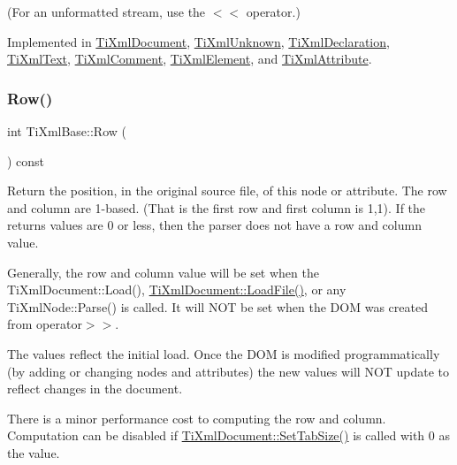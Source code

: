 (For an unformatted stream, use the $<$$<$ operator.) 

Implemented in \hyperlink{class_ti_xml_document_aa9e166fae51da603641380a964f21eeb}{Ti\+Xml\+Document}, \hyperlink{class_ti_xml_unknown_a5793fbc48ab3419783c0e866ca2d334e}{Ti\+Xml\+Unknown}, \hyperlink{class_ti_xml_declaration_ae46cff6565f299210ab945e78bf28514}{Ti\+Xml\+Declaration}, \hyperlink{class_ti_xml_text_a75f6895906333894e2574cc8cf77ea79}{Ti\+Xml\+Text}, \hyperlink{class_ti_xml_comment_a873171beac19d40f0eaae945711c98ed}{Ti\+Xml\+Comment}, \hyperlink{class_ti_xml_element_aa31a15cddfb8601a31236fe7d2569fb4}{Ti\+Xml\+Element}, and \hyperlink{class_ti_xml_attribute_a68ae373e03b9c35be4c9d0c3c233b894}{Ti\+Xml\+Attribute}.

\hypertarget{class_ti_xml_base_ad0cacca5d76d156b26511f46080b442e}{}\label{class_ti_xml_base_ad0cacca5d76d156b26511f46080b442e} 
\subsubsection{\texorpdfstring{Row()}{Row()}}
{\footnotesize\ttfamily int Ti\+Xml\+Base\+::\+Row (\begin{DoxyParamCaption}{ }\end{DoxyParamCaption}) const\hspace{0.3cm}{\ttfamily [inline]}}

Return the position, in the original source file, of this node or attribute. The row and column are 1-\/based. (That is the first row and first column is 1,1). If the returns values are 0 or less, then the parser does not have a row and column value.

Generally, the row and column value will be set when the Ti\+Xml\+Document\+::\+Load(), \hyperlink{class_ti_xml_document_a4c852a889c02cf251117fd1d9fe1845f}{Ti\+Xml\+Document\+::\+Load\+File()}, or any Ti\+Xml\+Node\+::\+Parse() is called. It will N\+OT be set when the D\+OM was created from operator$>$$>$.

The values reflect the initial load. Once the D\+OM is modified programmatically (by adding or changing nodes and attributes) the new values will N\+OT update to reflect changes in the document.

There is a minor performance cost to computing the row and column. Computation can be disabled if \hyperlink{class_ti_xml_document_a51dac56316f89b35bdb7d0d433ba988e}{Ti\+Xml\+Document\+::\+Set\+Tab\+Size()} is called with 0 as the value.

